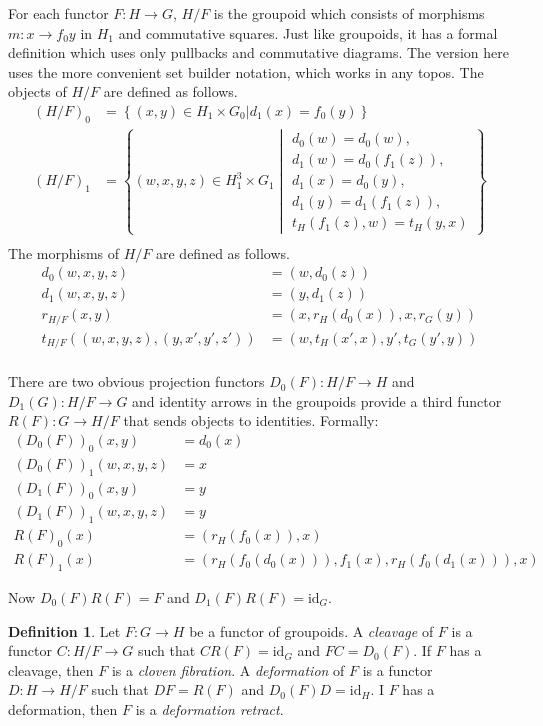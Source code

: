 \documentclass{amsart}
\theoremstyle{plain}
\theoremstyle{definition}
\newtheorem{defin}[theorem]{Definition}
\newcommand\set[1]{\left\{#1\right\}}
\newcommand\id{\mathrm{id}}
\begin{document}
For each functor $F:H\to G$, $H/F$ is the groupoid which consists of morphisms $m:x\to f_0 y$ in $H_1$ and commutative squares. Just like groupoids, it has a formal definition which uses only pullbacks and commutative diagrams. The version here uses the more convenient set builder notation, which works in any topos.
The objects of $H/F$ are defined as follows.
\begin{align*}
(H/F)_0 &= \set{(x,y)\in H_1\times G_0| d_1(x) = f_0(y) }\\
(H/F)_1 &= \set{(w,x,y,z)\in H_1^3\times G_1 \middle| \begin{array}{c} d_0(w) = d_0(w),\\ d_1(w)=d_0(f_1(z)),\\ d_1(x)=d_0(y),\\ d_1(y)=d_1(f_1(z)),\\ t_H(f_1(z),w) = t_H(y,x) \end{array}}\\
\end{align*}
The morphisms of $H/F$ are defined as follows.
\begin{align*}
d_0(w,x,y,z) &= (w,d_0(z))\\
d_1(w,x,y,z) &= (y,d_1(z))\\
r_{H/F}(x,y) &= (x,r_H(d_0(x)),x,r_G(y))\\
t_{H/F}((w,x,y,z),(y,x',y',z')) &= (w,t_H(x',x),y',t_G(y',y))\\
\end{align*}

There are two obvious projection functors $D_0(F): H/F \to H$ and $D_1(G):H/F\to G$ and identity arrows in the groupoids provide a third functor $R(F):G\to H/F$ that sends objects to identities. Formally:
\begin{align*}
(D_0(F))_0(x,y) &= d_0(x) \\
(D_0(F))_1(w,x,y,z) &= x \\
(D_1(F))_0(x,y) &= y \\
(D_1(F))_1(w,x,y,z) &= y \\
R(F)_0(x) &= (r_H(f_0(x)),x) \\
R(F)_1(x) &= (r_H(f_0(d_0(x))),f_1(x),r_H(f_0(d_1(x))), x)
\end{align*}

Now $D_0(F)R(F) = F$ and $D_1(F)R(F) = \id_{G}$.

\begin{defin} Let $F:G\to H$ be a functor of groupoids. A \emph{cleavage} of $F$ is a functor $C:H/F \to G$ such that $CR(F)=\id_G$ and $FC = D_0(F)$. If $F$ has a cleavage, then $F$ is a \emph{cloven fibration}. A \emph{deformation} of $F$ is a functor $D:H\to H/F$ %
such that $DF = R(F)$ and $D_0(F)D = \id_H$. I $F$ has a deformation, then $F$ is a \emph{deformation retract}.
\end{defin}
\end{document}
